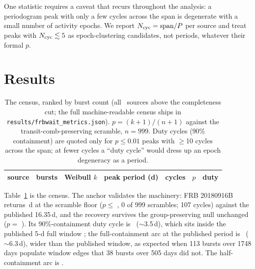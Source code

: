 \documentclass[twocolumn]{aastex631}
\newcommand{\code}[1]{\texttt{#1}}
\begin{document}
One statistic requires a caveat that recurs throughout the analysis: a periodogram peak with
only a few cycles across the span is degenerate with a small number of activity epochs. We report
$N_{\rm cyc}={\rm span}/P$ per source and treat peaks with $N_{\rm cyc}\lesssim5$ as
epoch-clustering candidates, not periods, whatever their formal $p$.

\section{Results}
\label{sec:results}
\begin{table}
\centering
\caption{The census, ranked by burst count (all \fwRealNStats\ sources above the completeness
cut; the full machine-readable census ships in \code{results/frbwait\_metrics.json}).
$p=(k{+}1)/(n{+}1)$ against the transit-comb-preserving scramble, $n=999$. Duty cycles
(90\% containment) are quoted only for $p\le0.01$ peaks with $\ge$10 cycles across the span;
at fewer cycles a ``duty cycle'' would dress up an epoch degeneracy as a period.}
\label{tab:census}
\begin{tabular}{lllllll}
\hline
source & bursts & Weibull $k$ & peak period (d) & cycles & $p$ & duty \\
\hline

\end{tabular}
\end{table}

Table~\ref{tab:census} is the census. The anchor validates the machinery:
FRB 20180916B returns \fwRealAnchorPeriod\,d at the scramble floor ($p\le$ \fwRealAnchorP,
0 of 999 scrambles; 107 cycles) against the published 16.35\,d, and the recovery survives the
group-preserving null unchanged ($p=$ \fwRealAnchorPGrouped). Its 90\%-containment duty cycle
is \fwRealAnchorDuty\ ($\sim$3.5\,d), which sits inside the published 5-d full window
\citep{chime2020period}; the full-containment arc at the published period is
\fwRealAnchorDutyFullPub\ ($\sim$6.3\,d), wider than the published window, as expected when
113 bursts over 1748 days populate window edges that 38 bursts over 505 days did not. The
half-containment arc is \fwRealAnchorDutyHalf.
\end{document}
